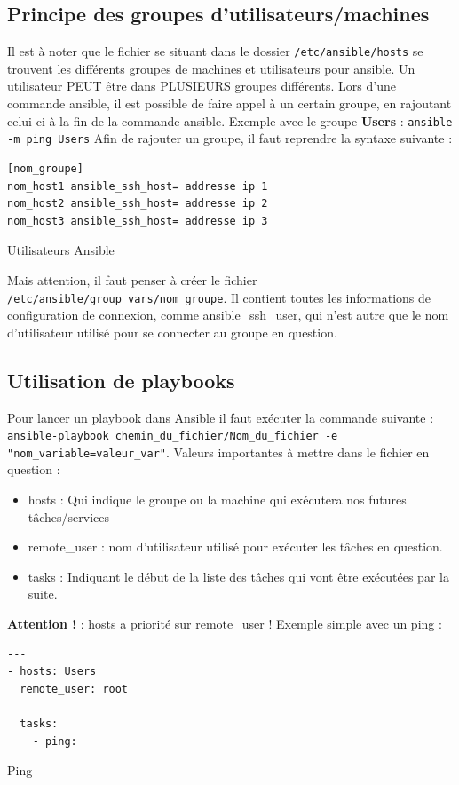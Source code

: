 \documentclass[a4paper, 12pt]{article}
\newenvironment{code}{\captionsetup{type=listing}}{}
\begin{document}
\subsection{Principe des groupes d'utilisateurs/machines}
Il est à noter que le fichier se situant dans le dossier \texttt{/etc/ansible/hosts} se trouvent les
différents groupes de machines et utilisateurs pour ansible.
Un utilisateur PEUT être dans PLUSIEURS groupes différents. Lors d'une commande ansible, il est possible de faire
appel à un certain groupe, en rajoutant celui-ci à la fin de la commande ansible.
Exemple avec le groupe \textbf{Users} : \texttt{ansible -m ping Users}
\bigbreak
Afin de rajouter un groupe, il faut reprendre la syntaxe suivante :
\begin{code}
    \begin{verbatim}
[nom_groupe]
nom_host1 ansible_ssh_host= addresse ip 1
nom_host2 ansible_ssh_host= addresse ip 2
nom_host3 ansible_ssh_host= addresse ip 3
    \end{verbatim}
    \caption{Utilisateurs Ansible}
    \label{Utilisateurs_ansible}
\end{code}
\bigbreak
Mais attention, il faut penser à créer le fichier \texttt{/etc/ansible/group_vars/nom_groupe}.
Il contient toutes les informations de configuration de connexion, comme ansible\_ssh\_user, qui n'est autre
que le nom d'utilisateur utilisé pour se connecter au groupe en question.



\subsection{Utilisation de playbooks}
Pour lancer un playbook dans Ansible il faut exécuter la commande suivante :
\\
\texttt{ansible-playbook chemin_du_fichier/Nom_du_fichier -e "nom_variable=valeur_var"}.
\bigbreak
Valeurs importantes à mettre dans le fichier en question :
\begin{itemize}
    \item hosts : Qui indique  le groupe ou la machine qui exécutera nos futures tâches/services
    \item remote\_user : nom d'utilisateur utilisé pour exécuter les tâches en question.
    \item tasks : Indiquant le début de la liste des tâches qui vont être exécutées par la suite.
\end{itemize}
\textbf{Attention !} : hosts a priorité sur remote\_user !
\bigbreak
Exemple simple avec un ping :
\begin{code}
    \begin{verbatim}
---
- hosts: Users
  remote_user: root

  tasks:
    - ping:
    \end{verbatim}
    \caption{Ping}
    \label{Ping}
\end{code}
\bigbreak
\end{document}
